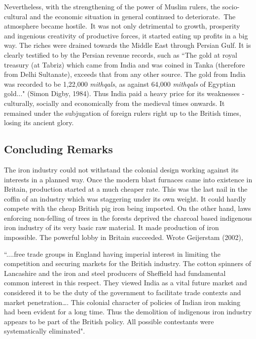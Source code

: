 Nevertheless, with the strengthening of the power of Muslim rulers, the socio-cultural and the economic situation in general continued to deteriorate.~The atmosphere became hostile.~It was not only detrimental to growth, prosperity and ingenious creativity of productive forces, it started eating up profits in a big way. The riches were drained towards the Middle East through Persian Gulf. It is clearly testified to by the Persian revenue records, such as {\footnotesize{``The gold at royal treasury (at Tabriz) which came from India and was coined in Tanka (therefore from Delhi Sultanate), exceeds that from any other source. The gold from India was recorded to be 1,22,000 {\it mithqals}, as against 64,000 {\it mithqals} of Egyptian gold..."}} (Simon Digby, 1984). Thus India paid a heavy price for its weaknesses - culturally, socially and economically from the medieval times onwards. It remained under the subjugation of foreign rulers right up to the British times, losing its ancient glory.

\vspace{-.35cm}

\subsection*{Concluding Remarks}\label{chapter8-subsection-9}

\vspace{-.2cm}

The iron industry could not withstand the colonial design working against its interests in a planned way. Once the modern blast furnaces came into existence in Britain, production started at a much cheaper rate. This was the last nail in the coffin of an industry which was staggering under its own weight. It could hardly compete with the cheap British pig iron being imported. On the other hand, laws enforcing non-felling of trees in the forests deprived the charcoal based indigenous iron industry of its very basic raw material. It made production of iron impossible. The powerful lobby in Britain succeeded. Wrote Geijerstam (2002),

{\footnotesize{“....free trade groups in England having imperial interest in limiting the competition and securing markets for the British industry. The cotton spinners of Lancashire and the iron and steel producers of Sheffield had fundamental common interest in this respect. They viewed India as a vital future market and considered it to be the duty of the government to facilitate trade contexts and market penetration…. This colonial character of policies of Indian iron making had been evident for a long time. Thus the demolition of indigenous iron industry appears to be part of the British policy. All possible contestants were systematically eliminated".}} 

